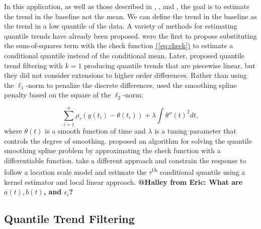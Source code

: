 \documentclass[aoas]{imsart}
\makeatletter
\newcommand{\Halley}[2]{{\bf {\color{purple}@Halley from #1: #2}}\xspace}
\newcommand{\Eqn}[1]{\hyperref[eq:#1]{{\rm (\ref*{eq:#1})}}} %
\newcommand{\Eqn}[1]{{(\ref{eq:#1})}} %
\makeatother
\begin{document}
In this application, as well as those described in \cite{Ning2014}, \cite{marandi2015qualitative}, and \cite{pettersson2013algorithm}, the goal is to estimate the trend in the baseline not the mean. We can define the trend in the baseline as the trend in a low quantile of the data. A variety of methods for estimating quantile trends have already been proposed. \cite{Koenker1978} were the first to propose substituting the sum-of-squares term with the check function  \Eqn{check} to estimate a conditional quantile instead of the conditional mean. Later, \cite{KoenkerNgPortnoy1994} proposed quantile trend filtering with $k = 1$ producing quantile trends that are piecewise linear, but they did not consider extensions to higher order differences. Rather than using the $\ell_1$-norm to penalize the discrete differences, \cite{nychka1995nonparametric} used the smoothing spline penalty based on the square of the $\ell_2$-norm:

\begin{equation*}
\label{eq:smoothingspline}
\sum_{i=1}^n\rho_{\tau}(y(t_i) - \theta(t_i)) + \lambda\int \theta''(t)^2 dt,
\end{equation*}
where $\theta(t)$ is a smooth function of time and $\lambda$ is a tuning parameter that controls the degree of smoothing. \cite{Oh2011} proposed an algorithm for solving the quantile smoothing spline problem by approximating the check function with a differentiable function. \cite{Racine2017} take a different approach and constrain the response to follow a location scale model and estimate the $\tau$\textsuperscript{th} conditional quantile using a kernel estimator and local linear approach. \Halley{Eric}{What are $a(t), b(t)$, and $\epsilon_i$?}


\subsection{Quantile Trend Filtering}
\end{document}
